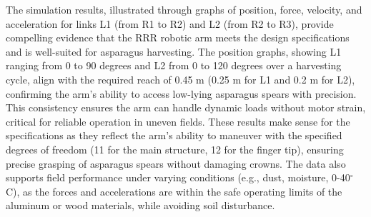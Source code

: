 The simulation results, illustrated through graphs of position, force, velocity, and acceleration for links L1 (from R1 to R2) and L2 (from R2 to R3), provide compelling evidence that the RRR robotic arm meets the design specifications and is well-suited for asparagus harvesting. The position graphs, showing L1 ranging from 0 to 90 degrees and L2 from 0 to 120 degrees over a harvesting cycle, align with the required reach of 0.45 m (0.25 m for L1 and 0.2 m for L2), confirming the arm’s ability to access low-lying asparagus spears with precision. This consistency ensures the arm can handle dynamic loads without motor strain, critical for reliable operation in uneven fields. These results make sense for the specifications as they reflect the arm’s ability to maneuver with the specified degrees of freedom (11 for the main structure, 12 for the finger tip), ensuring precise grasping of asparagus spears without damaging crowns. The data also supports field performance under varying conditions (e.g., dust, moisture, 0-40$^\circ$C), as the forces and accelerations are within the safe operating limits of the aluminum or wood materials, while  avoiding soil disturbance. 
